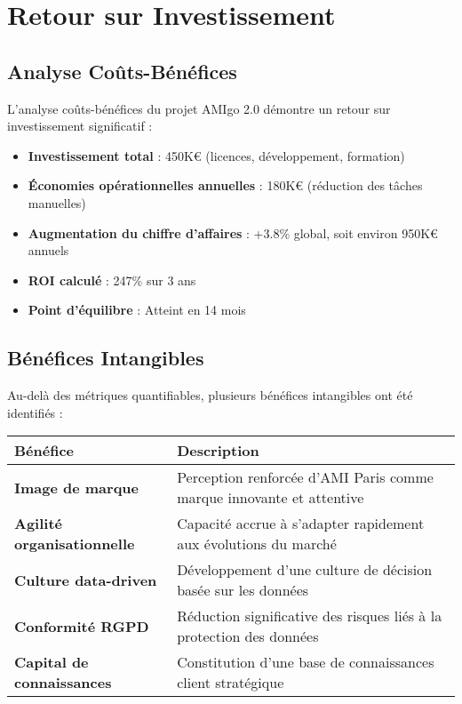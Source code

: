 \section{Retour sur Investissement}

\subsection{Analyse Coûts-Bénéfices}

\begin{mdframed}[backgroundcolor=lightgreen!20, linewidth=1pt]
L'analyse coûts-bénéfices du projet AMIgo 2.0 démontre un retour sur investissement significatif :

\begin{itemize}
    \item \textbf{Investissement total} : 450K€ (licences, développement, formation)
    \item \textbf{Économies opérationnelles annuelles} : 180K€ (réduction des tâches manuelles)
    \item \textbf{Augmentation du chiffre d'affaires} : +3.8\% global, soit environ 950K€ annuels
    \item \textbf{ROI calculé} : 247\% sur 3 ans
    \item \textbf{Point d'équilibre} : Atteint en 14 mois
\end{itemize}
\end{mdframed}

\subsection{Bénéfices Intangibles}

Au-delà des métriques quantifiables, plusieurs bénéfices intangibles ont été identifiés :

\begin{center}
\begin{tabular}{|>{\bfseries}p{4cm}|p{9.5cm}|}
\hline
\rowcolor{lightblue} Bénéfice & Description \\
\hline
Image de marque & Perception renforcée d'AMI Paris comme marque innovante et attentive \\
\hline
Agilité organisationnelle & Capacité accrue à s'adapter rapidement aux évolutions du marché \\
\hline
Culture data-driven & Développement d'une culture de décision basée sur les données \\
\hline
Conformité RGPD & Réduction significative des risques liés à la protection des données \\
\hline
Capital de connaissances & Constitution d'une base de connaissances client stratégique \\
\hline
\end{tabular}
\end{center}

